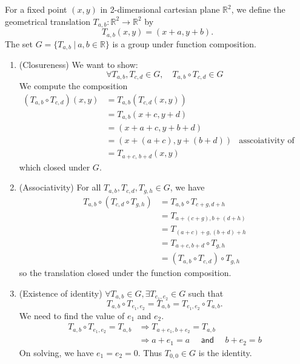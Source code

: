 \begin{example}
    For a fixed point $(x,y)$ in 2-dimensional cartesian plane $\mathbb{R}^2$, we define the geometrical translation $T_{a,b} : \mathbb{R}^2 \to \mathbb{R}^2$
    by 
    \[
        T_{a,b}(x,y) = (x+a, y+b).
    \]
    The set $G = \{ T_{a,b} \> | \> a,b \in \mathbb{R}\}$ is a group under function composition.
\end{example}
\begin{solution}
    \begin{enumerate}
        \item (Closureness) We want to show:
            \[
                \forall T_{a,b}, T_{c,d} \in G, \quad T_{a,b} \circ T_{c,d} \in G
            \]
        We compute the composition 
        \begin{align*}
            (T_{a,b} \circ T_{c,d})(x,y) &= T_{a,b}(T_{c,d}(x,y))\\
            &= T_{a,b}(x+c, y+d)\\
            &= (x+a+c,y+b+d)\\
            &= (x+(a+c), y+(b+d)) & \text{asscoiativity of ordinary addition}\\
            &= T_{a+c,\, b+d}(x,y)
        \end{align*}
        which closed under $G$.

        \item (Associativity) For all $T_{a,b}, T_{c,d}, T_{g,h} \in G$, we have 
        \begin{align*}
            T_{a,b} \circ (T_{c,d} \circ T_{g,h}) &= T_{a,b} \circ T_{c+g, d+h}\\
            &= T_{a+(c+g), b+(d+h)}\\
            &= T_{(a+c)+g, (b+d)+h}\\
            &= T_{a+c, b+d} \circ T_{g,h}\\
            &= (T_{a,b} \circ T_{c,d}) \circ T_{g,h}
        \end{align*}
        so the translation closed under the function composition.

        \item (Existence of identity) $\forall T_{a,b} \in G, \exists T_{e_1, e_2} \in G$ such that 
        \[
            T_{a,b} \circ T_{e_1, e_2} = T_{a,b} = T_{e_1, e_2} \circ T_{a,b}.
        \]
        We need to find the value of $e_1$ and $e_2$. 
        \begin{align*}
            T_{a,b} \circ T_{e_1, e_2} = T_{a,b} &\Rightarrow T_{a+e_1, b+e_2} = T_{a,b}\\
            &\Rightarrow a + e_1 = a \quad \textsf{ and } \quad b + e_2 = b
        \end{align*}
        On solving, we have $e_1 = e_2 = 0$. Thus $T_{0,0} \in G$ is the identity.


\end{enumerate}
\end{solution}
